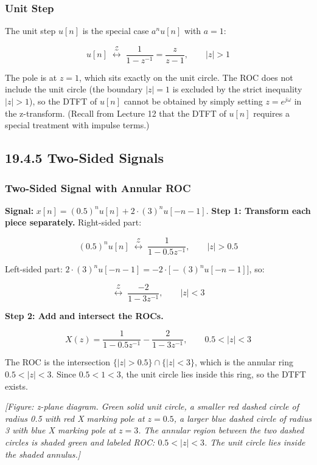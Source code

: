 \documentclass[11pt]{article}
\begin{document}
\subsubsection*{Unit Step}

The unit step $u[n]$ is the special case $a^n u[n]$ with $a = 1$:

\[u[n] \;\overset{\mathcal{Z}}{\longleftrightarrow}\; \frac{1}{1 - z^{-1}} = \frac{z}{z - 1}, \qquad |z| > 1\]

The pole is at $z = 1$, which sits exactly on the unit circle. The ROC does not include the unit circle (the boundary $|z| = 1$ is excluded by the strict inequality $|z| > 1$), so the DTFT of $u[n]$ cannot be obtained by simply setting $z = e^{j\omega}$ in the z-transform. (Recall from Lecture 12 that the DTFT of $u[n]$ requires a special treatment with impulse terms.)

\subsection*{19.4.5 Two-Sided Signals}

\subsubsection*{Two-Sided Signal with Annular ROC}

\textbf{Signal:} $x[n] = (0.5)^n u[n] + 2 \cdot (3)^n u[-n-1]$.
\textbf{Step 1: Transform each piece separately.}
Right-sided part:

\[(0.5)^n u[n] \;\overset{\mathcal{Z}}{\longleftrightarrow}\; \frac{1}{1 - 0.5 z^{-1}}, \qquad |z| > 0.5\]

Left-sided part: $2 \cdot (3)^n u[-n-1] = -2 \cdot \bigl[-(3)^n u[-n-1]\bigr]$, so:

\[\overset{\mathcal{Z}}{\longleftrightarrow}\; \frac{-2}{1 - 3z^{-1}}, \qquad |z| < 3\]

\textbf{Step 2: Add and intersect the ROCs.}

\[X(z) = \frac{1}{1 - 0.5 z^{-1}} - \frac{2}{1 - 3z^{-1}}, \qquad 0.5 < |z| < 3\]

The ROC is the intersection $\{|z| > 0.5\} \cap \{|z| < 3\}$, which is the annular ring $0.5 < |z| < 3$. Since $0.5 < 1 < 3$, the unit circle lies inside this ring, so the DTFT exists. \checkmark

\textit{[Figure: z-plane diagram. Green solid unit circle, a smaller red dashed circle of radius 0.5 with red X marking pole at $z = 0.5$, a larger blue dashed circle of radius 3 with blue X marking pole at $z = 3$. The annular region between the two dashed circles is shaded green and labeled ROC: $0.5 < |z| < 3$. The unit circle lies inside the shaded annulus.]}
\end{document}
